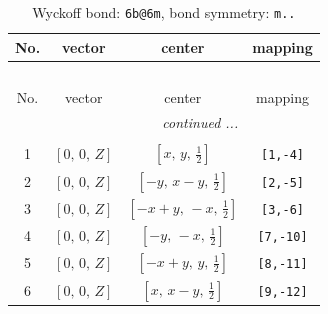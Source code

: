 \documentclass[fleqn,8pt]{jsarticle}
\begin{document}
\begin{longtable}{cccc}
\caption{Wyckoff bond: {\tt 6b@6m}, bond symmetry: {\tt m..}}
 \\
 \hline \hline
No. & vector & center & mapping \\ \hline \endfirsthead

\multicolumn{3}{l}{\tablename\ \thetable{}} \\
 \hline \hline
No. & vector & center & mapping \\ \hline \endhead

 \hline \hline
\multicolumn{3}{r}{\footnotesize\it continued ...} \\ \endfoot

 \hline \hline
\multicolumn{3}{r}{} \\ \endlastfoot

1 & $\left[ 0,\, 0,\, Z \right]$ & $\left[ x,\, y,\, \frac{1}{2} \right]$ & {\tt [1,-4]} \\ \hline
2 & $\left[ 0,\, 0,\, Z \right]$ & $\left[ - y,\, x - y,\, \frac{1}{2} \right]$ & {\tt [2,-5]} \\ \hline
3 & $\left[ 0,\, 0,\, Z \right]$ & $\left[ - x + y,\, - x,\, \frac{1}{2} \right]$ & {\tt [3,-6]} \\ \hline
4 & $\left[ 0,\, 0,\, Z \right]$ & $\left[ - y,\, - x,\, \frac{1}{2} \right]$ & {\tt [7,-10]} \\ \hline
5 & $\left[ 0,\, 0,\, Z \right]$ & $\left[ - x + y,\, y,\, \frac{1}{2} \right]$ & {\tt [8,-11]} \\ \hline
6 & $\left[ 0,\, 0,\, Z \right]$ & $\left[ x,\, x - y,\, \frac{1}{2} \right]$ & {\tt [9,-12]} \\
\end{longtable}
\renewcommand{\arraystretch}{1.2}
\end{document}
